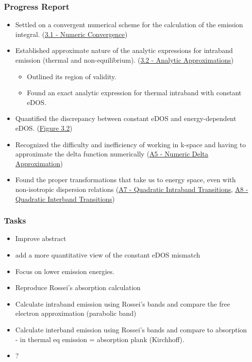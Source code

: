 \subsubsection{Progress Report}
\begin{itemize}
  \item Settled on a convergent numerical scheme for the calculation of the emission integral. (\hyperref[sec:numeric_convergence]{3.1 - Numeric Convergence})
  \item Established approximate nature of the analytic expressions for intraband emission (thermal and non-equilibrium). (\hyperref[sec:analytic_approximations]{3.2 - Analytic Approximations})
  \begin{itemize}
    \item Outlined its region of validity.
    \item Found an exact analytic expression for thermal intraband with constant eDOS.
  \end{itemize}
  \item Quantified the discrepancy between constant eDOS and energy-dependent eDOS. (\hyperref[fig:constant_edos_approximation]{Figure 3.2})
  \item Recognized the difficulty and inefficiency of working in k-space and having to approximate the delta function numerically (\hyperref[app:numeric_delta_approximation]{A5 - Numeric Delta Approximation})
  \item Found the proper transformations that take us to energy space, even with non-isotropic dispersion relations (\hyperref[app:quadratic_intraband_transitions]{A7 - Quadratic Intraband Transitions}, \hyperref[app:quadratic_interband_transitions]{A8 - Quadratic Interband Transitions})
\end{itemize}

\subsubsection{Tasks}
\begin{itemize}
  \item[$\boxtimes$] Improve abstract
  \item[$\boxtimes$] add a more quantitative view of the constant eDOS mismatch
  \item[$\square$] Focus on lower emission energies.
  \item[$\square$] Reproduce Rossei's absorption calculation
  \item[$\square$] Calculate intraband emission using Rossei's bands and compare the free electron approximation (parabolic band)
  \item[$\square$] Calculate interband emission using Rossei's bands and compare to absorption - in thermal eq emission = absorption\* plank (Kirchhoff).
  \item[$\square$] ?
\end{itemize}

